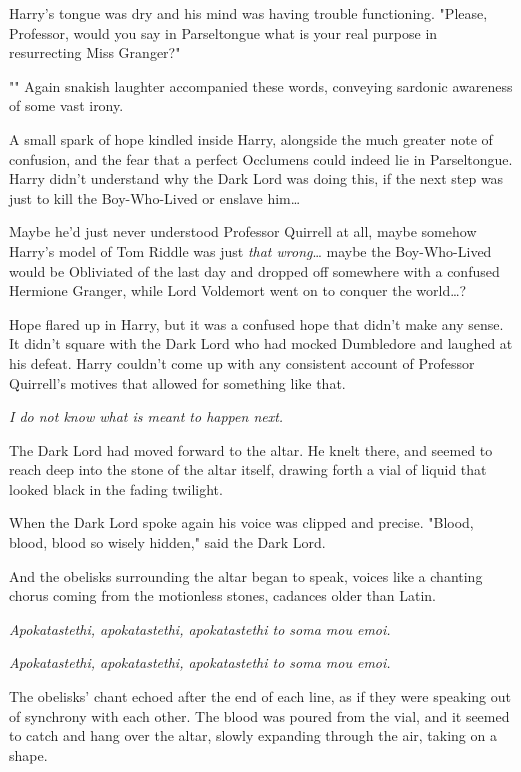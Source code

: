 Harry's tongue was dry and his mind was having trouble functioning. "Please,
Professor, would you say in Parseltongue what is your real purpose in
resurrecting Miss Granger?"

"" Again snakish laughter
accompanied these words, conveying sardonic awareness of some vast irony.

A small spark of hope kindled inside Harry, alongside the much greater note of
confusion, and the fear that a perfect Occlumens could indeed lie in
Parseltongue. Harry didn't understand why the Dark Lord was doing this, if the
next step was just to kill the Boy-Who-Lived or enslave him{\ldots}

Maybe he'd just never understood Professor Quirrell at all, maybe somehow
Harry's model of Tom Riddle was just \emph{that wrong}{\ldots} maybe the
Boy-Who-Lived would be Obliviated of the last day and dropped off somewhere
with a confused Hermione Granger, while Lord Voldemort went on to conquer the
world{\ldots}?

Hope flared up in Harry, but it was a confused hope that didn't make any sense.
It didn't square with the Dark Lord who had mocked Dumbledore and laughed at
his defeat. Harry couldn't come up with any consistent account of Professor
Quirrell's motives that allowed for something like that.

\emph{I do not know what is meant to happen next.}

The Dark Lord had moved forward to the altar. He knelt there, and seemed to
reach deep into the stone of the altar itself, drawing forth a vial of liquid
that looked black in the fading twilight.

When the Dark Lord spoke again his voice was clipped and precise. "Blood,
blood, blood so wisely hidden," said the Dark Lord.

And the obelisks surrounding the altar began to speak, voices like a chanting
chorus coming from the motionless stones, cadances older than Latin.

\emph{Apokatastethi, apokatastethi, apokatastethi to soma mou emoi.}

\emph{Apokatastethi, apokatastethi, apokatastethi to soma mou emoi.}

The obelisks' chant echoed after the end of each line, as if they were speaking
out of synchrony with each other. The blood was poured from the vial, and it
seemed to catch and hang over the altar, slowly expanding through the air,
taking on a shape.


